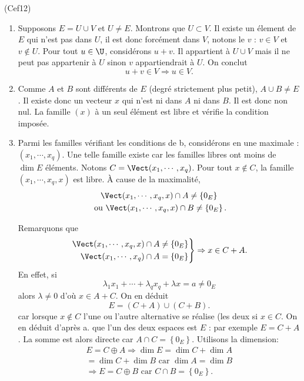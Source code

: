\begin{tiny}(Cef12)\end{tiny}
\begin{enumerate}
 \item Supposons $E = U \cup V$ et $U \neq E$. Montrons que $U \subset V$.\newline
 Il existe un élement de $E$ qui n'est pas dans $U$, il est donc forcément dans $V$, notons le $v$ : $v\in V$ et $v\notin U$.\newline
 Pour tout $u\in \U$, considérons $u+v$. Il appartient à $U \cup V$ mais il ne peut pas appartenir à $U$ sinon $v$ appartiendrait à $U$. On conclut
\[
 u + v \in V \Rightarrow u \in V.
\]

 \item Comme $A$ et $B$ sont différents de $E$ (degré strictement plus petit), $A \cup B \neq E$. Il existe donc un vecteur $x$ qui n'est ni dans $A$ ni dans $B$. Il est donc non nul. La famille $(x)$ à un seul élément est libre et vérifie la condition imposée.
 
 \item Parmi les familles vérifiant les conditions de b, considérons en une maximale : $(x_1,\cdots,x_q)$. Une telle famille existe car les familles libres ont moins de $\dim E$ éléments. Notons $C = \Vect(x_1,\cdots,x_q)$.\newline
 Pour tout $x\notin C$, la famille $(x_1,\cdots,x_q,x)$ est libre. \`A cause de la maximalité,
 \begin{multline*}
\Vect(x_1,\cdots,x_q,x) \cap A \neq \left\lbrace 0_E \right\rbrace  \\
\text{ ou }
  \Vect(x_1,\cdots,x_q,x) \cap B \neq \left\lbrace 0_E \right\rbrace.  
 \end{multline*}

Remarquons que
\[
\left. 
\begin{aligned}
 \Vect(x_1,\cdots,x_q,x) \cap A &\neq \left\lbrace 0_E \right\rbrace\\ \Vect(x_1,\cdots,x_q) \cap A &= \left\lbrace 0_E \right\rbrace
\end{aligned}
\right\rbrace 
\Rightarrow
x \in C + A.
\]
En effet, si 
\[ 
\lambda_1 x_1 + \cdots + \lambda_q x_q + \lambda x = a\neq 0_E
\]
alors $\lambda \neq 0$ d'où $x \in A + C$.
On en déduit
\[
 E = (C+A) \cup (C+B).
\]
car lorsque $x\notin C$ l'une ou l'autre alternative se réalise (les deux si $x\in C$.\newline
On en déduit d'après a. que l'un des deux espaces est $E$ : par exemple $E = C + A$. La somme est alors directe car $A\cap C = \left\lbrace 0_E\right\rbrace$. Utilisons la dimension:
\begin{multline*}
 E = C \oplus A \Rightarrow \dim E = \dim C + \dim A \\
 = \dim C + \dim B \text{ car } \dim A = \dim B \\
 \Rightarrow E = C \oplus B \text{ car } C \cap B = \left\lbrace 0_E\right\rbrace.
\end{multline*}


\end{enumerate}
